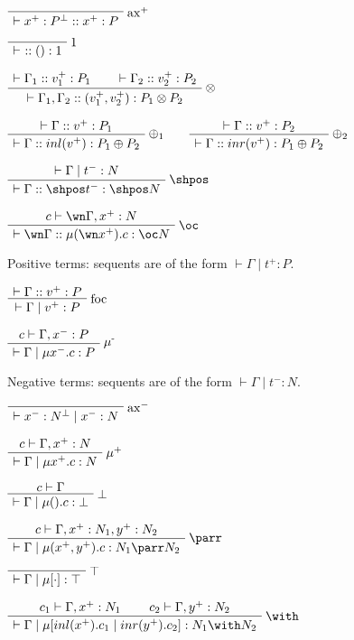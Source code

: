 \(\LabelRule{\rulename{ax}^+}
\NulRule{\vdash x^+:P\orth :: x^+: P}
\DisplayProof\)

\(\LabelRule{1}
\NulRule{\vdash \ :: () : 1}
\DisplayProof\)

\(\AxRule{\vdash \Gamma_1 :: v_1^+ : P_1}
\AxRule{\vdash \Gamma_2 :: v_2^+ : P_2}
\LabelRule{\rulename{\otimes}}
\BinRule{\vdash\Gamma_1, \Gamma_2 :: (v_1^+, v_2^+) : P_1\otimes P_2}
\DisplayProof\)

\(\AxRule{\vdash \Gamma :: v^+ : P_1}
\LabelRule{\rulename{\oplus_1}}
\UnaRule{\vdash\Gamma :: inl(v^+) : P_1\oplus P_2}
\DisplayProof
\qquad
\AxRule{\vdash \Gamma :: v^+ : P_2}
\LabelRule{\rulename{\oplus_2}}
\UnaRule{\vdash\Gamma :: inr(v^+) : P_1\oplus P_2}
\DisplayProof\)

\(\AxRule{\vdash \Gamma \mid t^- : N}
\LabelRule{\shpos}
\UnaRule{\vdash\Gamma :: \shpos t^- : \shpos N}
\DisplayProof\)

\(\AxRule{c \vdash \wn\Gamma, x^+ : N}
\LabelRule{\oc}
\UnaRule{\vdash\wn\Gamma :: \mu(\wn x^+).c : \oc N}
\DisplayProof\)

Positive terms: sequents are of the form \(\vdash\Gamma\mid t^+:P\).

\(\AxRule{\vdash \Gamma :: v^+ : P}
\LabelRule{\rulename{foc}}
\UnaRule{\vdash\Gamma \mid v^+ : P}
\DisplayProof\)

\(\AxRule{c \vdash \Gamma, x^- : P}
\LabelRule{\rulename{\mu^-}}
\UnaRule{\vdash\Gamma \mid\mu x^-.c : P}
\DisplayProof\)

Negative terms: sequents are of the form \(\vdash\Gamma\mid t^-:N\).

\(\LabelRule{\rulename{ax}^-}
\NulRule{\vdash x^-:N\orth \mid x^-: N}
\DisplayProof\)

\(\AxRule{c\vdash \Gamma, x^+: N}
\LabelRule{\mu^+}
\UnaRule{\vdash\Gamma \mid \mu x^+.c : N}
\DisplayProof\)

\(\AxRule{c \vdash \Gamma}
\LabelRule{\bot}
\UnaRule{\vdash \Gamma \mid \mu().c : \bot}
\DisplayProof\)

\(\AxRule{c\vdash \Gamma, x^+: N_1, y^+: N_2}
\LabelRule{\rulename{\parr}}
\UnaRule{\vdash\Gamma \mid \mu(x^+, y^+).c : N_1 \parr N_2}
\DisplayProof\)

\(\LabelRule{\rulename{\top}}
\NulRule{\vdash \Gamma \mid \mu[\cdot] : \top}
\DisplayProof\)

\(\AxRule{c_1\vdash \Gamma, x^+:N_1}
\AxRule{c_2\vdash \Gamma, y^+:N_2}
\LabelRule{\rulename{\with}}
\BinRule{\vdash\Gamma \mid \mu[inl(x^+).c_1 \mid inr(y^+).c_2] : N_1 \with N_2}
\DisplayProof\)


